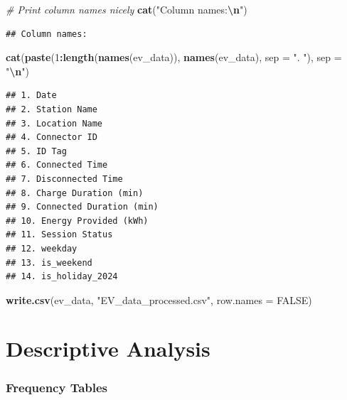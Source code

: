 \documentclass[
  12pt,
]{article}
\newenvironment{Shaded}{\begin{snugshade}}{\end{snugshade}}
\newcommand{\AttributeTok}[1]{\textcolor[rgb]{0.13,0.29,0.53}{#1}}
\newcommand{\CommentTok}[1]{\textcolor[rgb]{0.56,0.35,0.01}{\textit{#1}}}
\newcommand{\ConstantTok}[1]{\textcolor[rgb]{0.56,0.35,0.01}{#1}}
\newcommand{\DecValTok}[1]{\textcolor[rgb]{0.00,0.00,0.81}{#1}}
\newcommand{\FunctionTok}[1]{\textcolor[rgb]{0.13,0.29,0.53}{\textbf{#1}}}
\newcommand{\NormalTok}[1]{#1}
\newcommand{\SpecialCharTok}[1]{\textcolor[rgb]{0.81,0.36,0.00}{\textbf{#1}}}
\newcommand{\StringTok}[1]{\textcolor[rgb]{0.31,0.60,0.02}{#1}}
\begin{document}
\begin{Shaded}
\begin{Highlighting}[]
\CommentTok{\# Print column names nicely}
\FunctionTok{cat}\NormalTok{(}\StringTok{"Column names:}\SpecialCharTok{\textbackslash{}n}\StringTok{"}\NormalTok{)}
\end{Highlighting}
\end{Shaded}

\begin{verbatim}
## Column names:
\end{verbatim}

\begin{Shaded}
\begin{Highlighting}[]
\FunctionTok{cat}\NormalTok{(}\FunctionTok{paste}\NormalTok{(}\DecValTok{1}\SpecialCharTok{:}\FunctionTok{length}\NormalTok{(}\FunctionTok{names}\NormalTok{(ev\_data)), }\FunctionTok{names}\NormalTok{(ev\_data), }\AttributeTok{sep =} \StringTok{". "}\NormalTok{),}
    \AttributeTok{sep =} \StringTok{"}\SpecialCharTok{\textbackslash{}n}\StringTok{"}\NormalTok{)}
\end{Highlighting}
\end{Shaded}

\begin{verbatim}
## 1. Date
## 2. Station Name
## 3. Location Name
## 4. Connector ID
## 5. ID Tag
## 6. Connected Time
## 7. Disconnected Time
## 8. Charge Duration (min)
## 9. Connected Duration (min)
## 10. Energy Provided (kWh)
## 11. Session Status
## 12. weekday
## 13. is_weekend
## 14. is_holiday_2024
\end{verbatim}

\begin{Shaded}
\begin{Highlighting}[]
\FunctionTok{write.csv}\NormalTok{(ev\_data, }\StringTok{"EV\_data\_processed.csv"}\NormalTok{, }\AttributeTok{row.names =} \ConstantTok{FALSE}\NormalTok{)}
\end{Highlighting}
\end{Shaded}

\section{Descriptive Analysis}\label{descriptive-analysis}

\subsubsection{Frequency Tables}\label{frequency-tables}
\end{document}
